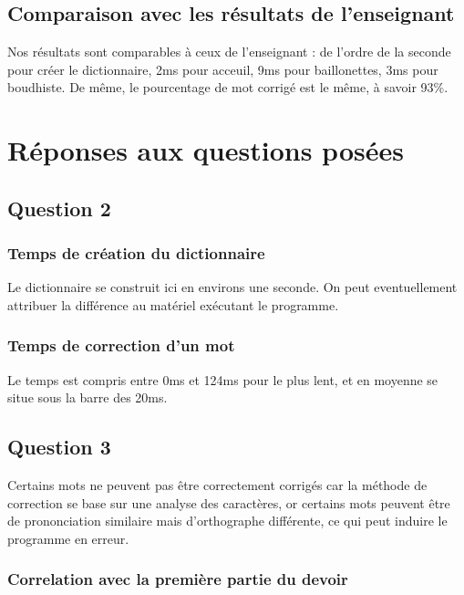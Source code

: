 \documentclass[french,12pt,a4]{report}
\begin{document}
\section{Comparaison avec les résultats de l'enseignant}

Nos résultats sont comparables à ceux de l'enseignant : de l'ordre de
la seconde pour créer le dictionnaire, 2ms pour acceuil, 9ms pour
baillonettes, 3ms pour boudhiste. De même, le pourcentage de mot
corrigé est le même, à savoir 93\%.
 

\chapter{Réponses aux questions posées}

\section{Question 2}



\subsection{Temps de création du dictionnaire}
Le dictionnaire se construit ici en environs une seconde. On peut
eventuellement attribuer la différence au matériel exécutant le programme.

\subsection{Temps de correction d'un mot}

Le temps est compris entre 0ms et 124ms pour le plus lent, et en
moyenne se situe sous la barre des 20ms.


\section{Question 3}

Certains mots ne peuvent pas être correctement corrigés car la méthode
de correction se base sur une analyse des caractères, or certains mots
peuvent être de prononciation similaire mais d'orthographe différente,
ce qui peut induire le programme en erreur.


\subsection{Correlation avec la première partie du devoir}
\end{document}
